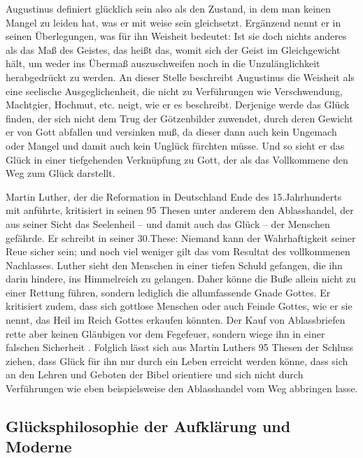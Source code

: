 Augustinus definiert \glqq glücklich sein\grqq{} also als den Zustand, in dem man keinen Mangel zu leiden hat, was er mit \glqq weise sein\grqq{} gleichsetzt. 
Ergänzend nennt er in seinen Überlegungen, was für ihn Weisheit bedeutet: \glqq Ist sie doch nichts anderes als das Maß des Geistes, das heißt das, womit sich der Geist im Gleichgewicht hält, um weder ins Übermaß auszuschweifen noch in die Unzulänglichkeit herabgedrückt zu werden.\grqq{} \cite[S.\,59]{A82} 
An dieser Stelle beschreibt Augustinus die Weisheit als eine seelische Ausgeglichenheit, die nicht zu Verführungen wie Verschwendung, Machtgier, Hochmut, etc. neigt, wie er es beschreibt. 
Derjenige werde das Glück finden, der sich nicht \glqq dem Trug der Götzenbilder zuwendet, durch deren Gewicht er von Gott abfallen und versinken muß\grqq{}, da dieser dann auch kein Ungemach oder Mangel und damit auch kein Unglück fürchten müsse. 
Und so sieht er das Glück in einer tiefgehenden Verknüpfung zu Gott, der als das Vollkommene den Weg zum Glück darstellt.

Martin Luther, der die Reformation in Deutschland Ende des 15.Jahrhunderts mit anführte, kritisiert in seinen 95 Thesen unter anderem den Ablasshandel, der aus seiner Sicht das Seelenheil -- und damit auch das Glück -- der Menschen gefährde. 
Er schreibt in seiner 30.These: \glqq Niemand kann der Wahrhaftigkeit seiner Reue sicher sein; und noch viel weniger gilt das vom Resultat des vollkommenen Nachlasses.\grqq{} \cite[S.\,56]{ML65}
Luther sieht den Menschen in einer tiefen Schuld gefangen, die ihn darin hindere, ins Himmelreich zu gelangen. 
Daher könne die Buße allein nicht zu einer Rettung führen, sondern lediglich die allumfassende Gnade Gottes. 
Er kritisiert zudem, dass sich gottlose Menschen oder auch Feinde Gottes, wie er sie nennt, das Heil im Reich Gottes erkaufen könnten. 
Der Kauf von Ablassbriefen rette aber keinen Gläubigen vor dem Fegefeuer, sondern wiege ihn in einer falschen Sicherheit \cite[S.\,58]{ML65}.
Folglich lässt sich aus Martin Luthers 95 Thesen der Schluss ziehen, dass Glück für ihn nur durch ein Leben erreicht werden könne, dass sich an den Lehren und Geboten der Bibel orientiere und sich nicht durch Verführungen wie eben beispielsweise den Ablasshandel vom Weg abbringen lasse.


\newpage

\subsection{Glücksphilosophie der Aufklärung und Moderne}

